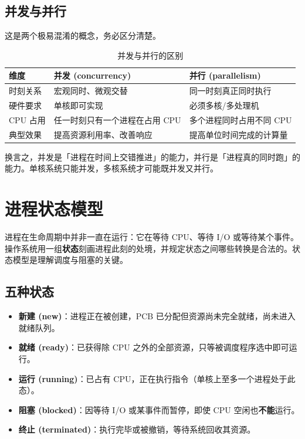 \subsection{并发与并行}

\noindent 这是两个极易混淆的概念，务必区分清楚。

\begin{table}[H]
\centering
\caption{并发与并行的区别}
\begin{tabulary}{\textwidth}{LLL}
\toprule
维度 & 并发 (concurrency) & 并行 (parallelism) \\
\midrule
时刻关系 & 宏观同时、微观交替 & 同一时刻真正同时执行 \\
硬件要求 & 单核即可实现 & 必须多核/多处理机 \\
CPU 占用 & 任一时刻只有一个进程在占用 CPU & 多个进程同时占用不同 CPU \\
典型效果 & 提高资源利用率、改善响应 & 提高单位时间完成的计算量 \\
\bottomrule
\end{tabulary}
\end{table}

\noindent 换言之，并发是「进程在时间上交错推进」的能力，并行是「进程真的同时跑」的能力。单核系统只能并发，多核系统才可能既并发又并行。

\section{进程状态模型}

\noindent 进程在生命周期中并非一直在运行：它在等待 CPU、等待 I/O 或等待某个事件。操作系统用一组\textbf{状态}刻画进程此刻的处境，并规定状态之间哪些转换是合法的。状态模型是理解调度与阻塞的关键。

\subsection{五种状态}

\begin{itemize}
    \item \textbf{新建 (new)}：进程正在被创建，PCB 已分配但资源尚未完全就绪，尚未进入就绪队列。
    \item \textbf{就绪 (ready)}：已获得除 CPU 之外的全部资源，只等被调度程序选中即可运行。
    \item \textbf{运行 (running)}：已占有 CPU，正在执行指令（单核上至多一个进程处于此态）。
    \item \textbf{阻塞 (blocked)}：因等待 I/O 或某事件而暂停，即使 CPU 空闲也\textbf{不能}运行。
    \item \textbf{终止 (terminated)}：执行完毕或被撤销，等待系统回收其资源。
\end{itemize}

